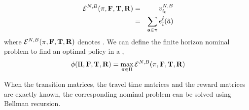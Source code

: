 \begin{eqnarray}
\mathcal{E}^{N,B}(\pi, {\mathbf{F}}, {\mathbf{T}}, {\mathbf{R}}) &=& v_{{i_0}}^{N,B} \\
&=& \sum_{\mathbf{a} \in \pi}e_{\hat{i}}^{\hat{t}}({\hat{a}})
\end{eqnarray}
where $\mathcal{E}^{N,B}(\pi, {\mathbf{F}}, {\mathbf{T}}, {\mathbf{R}})$ denotes {\totalexpectedearnings}. We can define the finite horizon nominal problem to find an optimal policy in a {\mdp},
\begin{equation}
\label{eq:nominal_problem}
\phi(\Pi, {\mathbf{F}}, {\mathbf{T}}, {\mathbf{R}}) = \max_{\pi \in \Pi} \mathcal{E}^{N,B}(\pi, {\mathbf{F}}, {\mathbf{T}}, {\mathbf{R}})
\end{equation}

When the transition matrices, the travel time matrices and the reward matrices are exactly known, the corresponding nominal problem can be solved using Bellman recursion.
